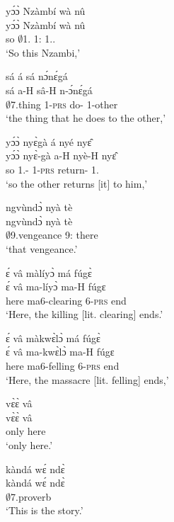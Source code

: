 \begin{exe}[(N234)]
\exN\label{n242}
  \glll yɔ́ɔ̀ Nzàmbí wà nû \\
         yɔ́ɔ̀ Nzàmbí wà nû \\
         so $\emptyset$1.{\PN} 1:{\ATT}  1.{\DEM}.{\PROX} \\
    \trans `So this Nzambi,'
 
\exN\label{n243}
  \glll sá á sá nɔ́nɛ́gá \\
      sá a-H sâ-H n-ɔ́nɛ́gá \\
        $\emptyset$7.thing 1-\textsc{prs} do-{\R} 1-other  \\
    \trans `the thing that he does to the other,'
 
\exN\label{n244} 
  \glll yɔ́ɔ̀ nyɛ̀gà á nyé nyɛ̂ \\
        yɔ́ɔ̀ nyɛ̀-gà a-H nyè-H nyɛ̂ \\
         so 1.{\SBJ}-{\CONTR} 1-\textsc{prs} return-{\R} 1.{\OBJ} \\
    \trans `so the other returns [it] to him,'
 
\exN\label{n245}
  \glll ngvùndɔ̀ nyà tè \\
       ngvùndɔ̀ nyà tè \\
        $\emptyset$9.vengeance 9:{\ATT}  there  \\
    \trans `that vengeance.'
 
\exN\label{n246}
  \glll ɛ́ vâ màlíyɔ̀ má fúgɛ̀ \\
       ɛ́ vâ ma-líyɔ̀ ma-H fúgɛ \\
         {\LOC} here ma6-clearing 6-\textsc{prs} end \\
    \trans `Here, the killing [lit. clearing] ends.'
 
\exN\label{n247}
  \glll ɛ́ vâ màkwɛ̀lɔ̀ má fúgɛ̀ \\
         ɛ́ vâ ma-kwɛ̀lɔ̀ ma-H fúgɛ \\
         {\LOC} here ma6-felling 6-\textsc{prs} end \\
    \trans `Here, the massacre [lit. felling] ends,'
 
\exN\label{n248}
  \glll vɛ̀ɛ̀ vâ \\
        vɛ̀ɛ̀ vâ \\
       only here   \\
    \trans `only here.'
 
\exN\label{n249}
  \glll kàndá wɛ́ ndɛ̀ \\
        kàndá wɛ́ ndɛ̀ \\
        $\emptyset$7.proverb {\ID} {\ANA}  \\
    \trans `This is the story.'
 

\end{exe}
